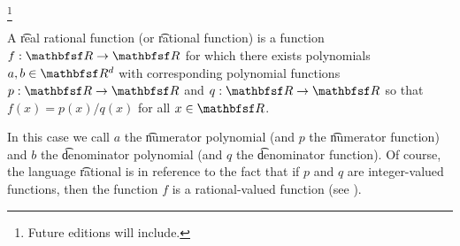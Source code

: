 
\footnote{Future editions will include.}


A \t{real rational function} (or \t{rational function}) is a function $f: \R \to \R$ for which there exists polynomials $a, b \in \R^{d}$ with corresponding polynomial functions $p: \R \to \R$ and $q: \R \to \R$ so that $f(x) = p(x) / q(x)$ for all $x \in \R$.

In this case we call $a$ the \t{numerator polynomial} (and $p$ the \t{numerator function}) and $b$ the \t{denominator polynomial} (and $q$ the \t{denominator function}).
Of course, the language \t{rational} is in reference to the fact that if $p$ and $q$ are integer-valued functions, then the function $f$ is a rational-valued function (see ).

\blankpage

